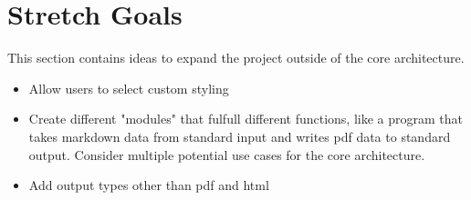 \documentclass[12pt]{article}
\begin{document}
\section{Stretch Goals}
	This section contains ideas to expand the project outside of the core architecture.
	\begin{itemize}
		\item Allow users to select custom styling
		\item Create different "modules" that fulfull different functions, like a program that takes markdown data from standard input and writes pdf data to standard output. Consider multiple potential use cases for the core architecture.
		\item Add output types other than pdf and html
	\end{itemize}
%
%
%
%
%
%
%
\end{document}
